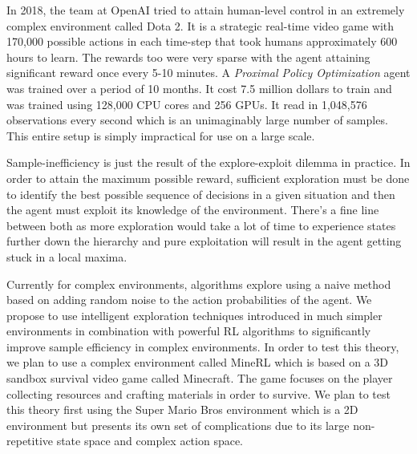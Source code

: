 \documentclass[12pt,a4paper]{article}
\begin{document}
In 2018, the team at OpenAI tried to attain human-level control in an extremely complex environment called Dota 2. It is a strategic real-time video game with 170,000 possible actions in each time-step that took humans approximately 600 hours to learn. The rewards too were very sparse with the agent attaining significant reward once every 5-10 minutes. A \textit{Proximal Policy Optimization} agent was trained over a period of 10 months. It cost 7.5 million dollars to train and was trained using 128,000 CPU cores and 256 GPUs. It read in 1,048,576 observations every second which is an unimaginably large number of samples. This entire setup is simply impractical for use on a large scale.

Sample-inefficiency is just the result of the explore-exploit dilemma 
in practice. In order to attain the maximum possible reward, sufficient
exploration must be done to identify the best possible sequence of decisions
in a given situation and then the agent must exploit its knowledge of the environment. There's a fine line between both as more exploration
would take a lot of time to experience states further down the hierarchy and pure 
exploitation will result in the agent getting stuck in a local maxima. 

Currently for complex environments, algorithms explore using a naive method based on adding random noise to the action probabilities of the agent. We propose to use intelligent exploration techniques introduced in much simpler environments in combination with powerful RL algorithms to significantly improve sample efficiency in complex environments. In order to test this theory, we plan to use a complex environment called MineRL which is based on a 3D sandbox survival video game
called Minecraft. The game focuses on the player collecting resources and crafting materials in order to survive. We plan to test this theory first using the Super Mario Bros environment which is a 2D environment but presents its own set of complications due to its large non-repetitive state space and complex action space.
\end{document}
